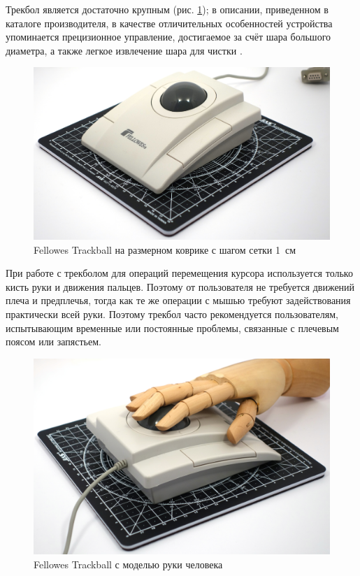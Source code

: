 \documentclass[11pt, a4paper]{article}
\begin{document}
Трекбол является достаточно крупным (рис. \ref{fig:FellowesTrackballSize}); в описании, приведенном в каталоге производителя, в качестве отличительных особенностей устройства упоминается прецизионное управление, достигаемое за счёт шара большого диаметра, а также легкое извлечение шара для чистки \cite{advertising}.

\begin{figure}[h]
    \centering
    \includegraphics[scale=0.3]{1997_fellowes_trackball/size_30.jpg}
    \caption{Fellowes Trackball на размерном коврике с шагом сетки 1~см}
    \label{fig:FellowesTrackballSize}
\end{figure}

При работе с трекболом для операций перемещения курсора используется только кисть руки и движения пальцев. Поэтому от пользователя не требуется движений плеча и предплечья, тогда как те же операции с мышью требуют задействования практически всей руки. Поэтому трекбол часто рекомендуется пользователям, испытывающим временные или постоянные проблемы, связанные с плечевым поясом или запястьем.

\begin{figure}[h]
    \centering
    \includegraphics[scale=0.3]{1997_fellowes_trackball/hand_30.jpg}
    \caption{Fellowes Trackball с моделью руки человека}
    \label{fig:FellowesTrackballHand}
\end{figure}
\end{document}
